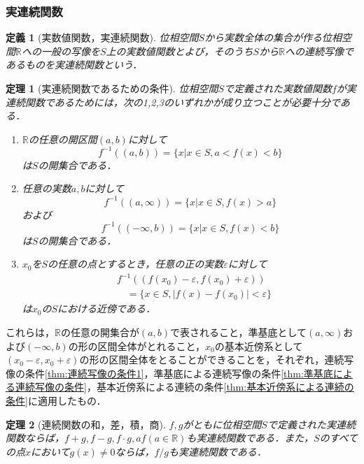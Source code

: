 \documentclass[a4paper,10pt,uplatex]{jsarticle}
\numberwithin{equation}{section}
\theoremstyle{mystyle}
\newtheorem{dfn}{定義}[section]
\newtheorem{thm}{定理}[section]
\newcommand{\R}{\mathbb{R}}
\begin{document}
\subsubsection{実連続関数}
\begin{dfn}[実数値関数，実連続関数]
    位相空間$S$から実数全体の集合が作る位相空間$\R$への一般の写像を$S$上の実数値関数とよび，そのうち$S$から$\R$への連続写像であるものを実連続関数という．
\end{dfn}

\begin{thm}[実連続関数であるための条件]
    位相空間$S$で定義された実数値関数$f$が実連続関数であるためには，次の1,2,3のいずれかが成り立つことが必要十分である．
    \begin{enumerate}
        \item $\R$の任意の開区間$(a,b)$に対して
        \begin{equation}
            f^{-1}((a,b)) = \{x | x \in S, a<f(x)<b\}
        \end{equation}
        は$S$の開集合である．

        \item 任意の実数$a,b$に対して
        \begin{equation}
            f^{-1}((a,\infty)) = \{x | x \in S, f(x) > a\}
        \end{equation}
        および
        \begin{equation}
            f^{-1}((-\infty,b)) = \{x | x \in S, f(x) < b\}
        \end{equation}
        は$S$の開集合である．

        \item $x_0$を$S$の任意の点とするとき，任意の正の実数$\varepsilon$に対して
        \begin{align}
            &f^{-1}((f(x_0)-\varepsilon, f(x_0)+\varepsilon)) \\
            &\quad = \{x \in S, |f(x) - f(x_0)| < \varepsilon\}
        \end{align}
        は$x_0$の$S$における近傍である．
    \end{enumerate}
\end{thm}
これらは，$\R$の任意の開集合が$(a,b)$で表されること，準基底として$(a,\infty)$および$(-\infty,b)$の形の区間全体がとれること，$x_0$の基本近傍系として$(x_0 - \varepsilon, x_0 + \varepsilon)$の形の区間全体をとることができることを，それぞれ，連続写像の条件\ref{thm:連続写像の条件1}，準基底による連続写像の条件\ref{thm:準基底による連続写像の条件}，基本近傍系による連続の条件\ref{thm:基本近傍系による連続の条件}に適用したもの．

\begin{thm}[連続関数の和，差，積，商]
    $f,g$がともに位相空間$S$で定義された実連続関数ならば，$f+g, f-g, f\cdot g, af(a\in\R)$も実連続関数である．また，$S$のすべての点$x$において$g(x)\neq 0$ならば，$f/g$も実連続関数である．
\end{thm} 
\end{document}
